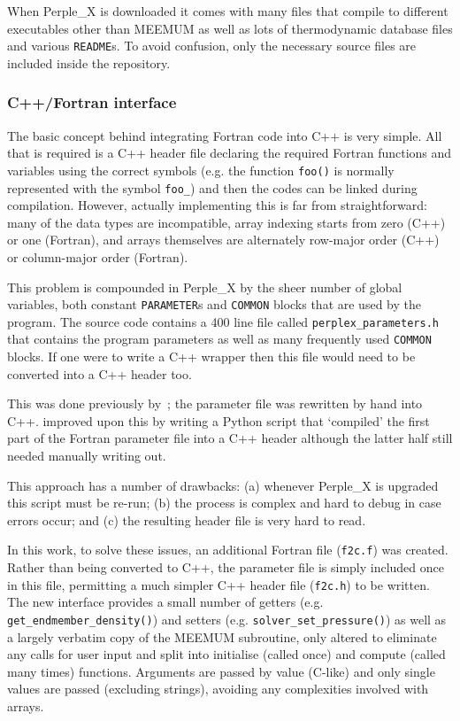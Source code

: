 When Perple\_X is downloaded it comes with many files that compile to different executables other than MEEMUM as well as lots of thermodynamic database files and various \texttt{README}s.
To avoid \mbox{confusion}, only the necessary source files are included inside the repository.

\subsubsection{C++/Fortran interface}

The basic concept behind integrating Fortran code into C++ is very simple. All that is required is a C++ header file declaring the required Fortran functions and variables using the correct symbols (e.g. the function \texttt{foo()} is normally represented with the symbol \texttt{foo\_}) and then the codes can be linked during compilation.
However, actually implementing this is far from straightforward: many of the data types are incompatible, array indexing starts from zero (C++) or one (Fortran), and arrays themselves are alternately row-major order (C++) or column-major order (Fortran).

This problem is compounded in Perple\_X by the sheer number of global variables, both constant \texttt{PARAMETER}s and \texttt{COMMON} blocks that are used by the program.
The source code contains a 400 line file called \texttt{perplex\_parameters.h} that contains the program parameters as well as many frequently used \texttt{COMMON} blocks.
If one were to write a C++ wrapper then this file would need to be converted into a C++ header too.

This was done previously by~\textcite{kaislaniemi_prplxwrap_2015}; the parameter file was rewritten by hand into C++.
\textcite{myhill_perplex_2018} improved upon this by writing a Python script that `compiled' the first part of the Fortran parameter file into a C++ header although the latter half still needed manually writing out.

This approach has a number of drawbacks: (a) whenever Perple\_X is upgraded this script must be re-run; (b) the process is complex and hard to debug in case errors occur; and (c) the resulting header file is very hard to read.

In this work, to solve these issues, an additional Fortran file (\texttt{f2c.f}) was created.
Rather than being converted to C++, the parameter file is simply included once in this file, permitting a much simpler C++ header file (\texttt{f2c.h}) to be written.
The new interface provides a small number of getters (e.g. \texttt{get\_endmember\_density()}) and setters (e.g. \texttt{solver\_set\_pressure()}) as well as a largely verbatim copy of the MEEMUM subroutine, only altered to eliminate any calls for user input and split into initialise (called once) and compute (called many times) functions.
Arguments are passed by value (C-like) and only single values are passed (excluding strings), avoiding any complexities involved with arrays.


